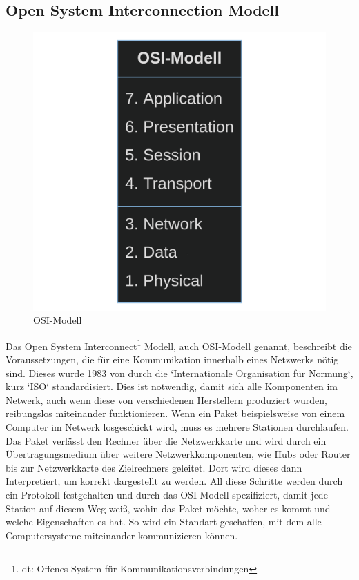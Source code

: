 \documentclass[12pt]{article}
\begin{document}
\subsection{Open System Interconnection Modell}


\begin{figure}
	\centering
	\includegraphics[scale=0.1]{Bilder/OSI-Modell}
	\caption{OSI-Modell}
	\label{fig:figure3}
	
\end{figure}



	Das Open System Interconnect\footnote{dt: Offenes System für Kommunikationsverbindungen} Modell, auch OSI-Modell genannt, beschreibt die Voraussetzungen, die für eine Kommunikation innerhalb eines Netzwerks nötig sind. Dieses wurde 1983 von durch die `Internationale Organisation für Normung`, kurz `ISO` standardisiert. Dies ist notwendig, damit sich alle Komponenten im Netwerk, auch wenn diese von verschiedenen Herstellern produziert wurden, reibungslos miteinander funktionieren. Wenn ein Paket beispielsweise von einem Computer im Netwerk losgeschickt wird, muss es mehrere Stationen durchlaufen. Das Paket verlässt den Rechner über die Netzwerkkarte und wird durch ein Übertragungsmedium über weitere Netzwerkkomponenten, wie Hubs oder Router bis zur Netzwerkkarte des Zielrechners geleitet. Dort wird dieses dann Interpretiert, um korrekt dargestellt zu werden. All diese Schritte werden durch ein Protokoll festgehalten und durch das OSI-Modell spezifiziert, damit jede Station auf diesem Weg weiß, wohin das Paket möchte, woher es kommt und welche Eigenschaften es hat. So wird ein Standart geschaffen, mit dem alle Computersysteme miteinander kommunizieren können.
	
\end{document}
